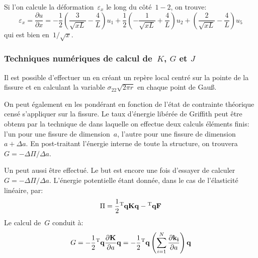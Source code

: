Si l'on calcule la déformation~$\varepsilon_x$ le long du côté~$1-2$, on trouve:
\begin{equation} \varepsilon_x = \dfrac{\partial u}{\partial x} =
-\frac12\left( \frac3{\sqrt{xL}}-\frac4L\right)u_1 + \frac12\left(-\frac1{\sqrt{xL}}+\frac4L\right)u_2
+\left(\frac2{\sqrt{xL}}-\frac4L\right)u_5 \end{equation}
qui est bien en~$1/\sqrt{x}$.

\medskip
\subsubsection{Techniques numériques de calcul de~$K$, $G$ et $J$}

Il est possible d'effectuer un  en créant un repère local centré sur la pointe de la fissure et en calculant la variable $\sigma_{22}\sqrt{2\pi r}$ en chaque point de Gauß.

\medskip
On peut également  en les pondérant en fonction de l'état de contrainte théorique censé s'appliquer sur la fissure.
\medskipvm
Le taux d'énergie libérée de Griffith peut être obtenu par la technique de  dans laquelle on effectue deux calculs éléments finis: l'un pour une fissure de dimension~$a$, l'autre pour une fissure de dimension~$a+\Delta a$. En post-traitant l'énergie interne de toute la structure, on trouvera~$G=-\Delta\Pi/\Delta a$. 

\medskip
Un  peut aussi être effectué. Le but est encore une fois d'essayer de calculer~$G=-\Delta\Pi/\Delta a$. L'énergie potentielle étant donnée, dans le cas de l'élasticité linéaire, par:
\begin{equation}\Pi = \frac12\LL{q}\MM{K}\VV{q}-\LL{q}\VV{F}\end{equation}
Le calcul de~$G$ conduit à:
\begin{equation}G = -\frac12\LL{q}\dfrac{\partial\MM{K}}{\partial a}\VV{q} =
-\frac12\LL{q}\left(\dsum_{i=1}^N \dfrac{\partial\MM{k_i}}{\partial a}\right)\VV{q}\end{equation}


